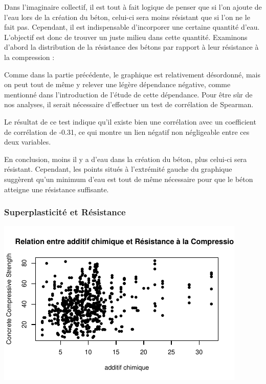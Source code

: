 \documentclass[
  12pt,
]{article}
\begin{document}
Dans l'imaginaire collectif, il est tout à fait logique de penser que si
l'on ajoute de l'eau lors de la création du béton, celui-ci sera moins
résistant que si l'on ne le fait pas. Cependant, il est indispensable
d'incorporer une certaine quantité d'eau. L'objectif est donc de trouver
un juste milieu dans cette quantité. Examinons d'abord la distribution
de la résistance des bétons par rapport à leur résistance à la
compression :

Comme dans la partie précédente, le graphique est relativement
désordonné, mais on peut tout de même y relever une légère dépendance
négative, comme mentionné dans l'introduction de l'étude de cette
dépendance. Pour être sûr de nos analyses, il serait nécessaire
d'effectuer un test de corrélation de Spearman.

Le résultat de ce test indique qu'il existe bien une corrélation avec un
coefficient de corrélation de -0.31, ce qui montre un lien négatif non
négligeable entre ces deux variables.

En conclusion, moins il y a d'eau dans la création du béton, plus
celui-ci sera résistant. Cependant, les points situés à l'extrémité
gauche du graphique suggèrent qu'un minimum d'eau est tout de même
nécessaire pour que le béton atteigne une résistance suffisante.

\subsubsection{Superplasticité et
Résistance}\label{superplasticituxe9-et-ruxe9sistance}

\begin{center}\includegraphics{rmd_final_files/figure-latex/unnamed-chunk-20-1} \end{center}
\end{document}
